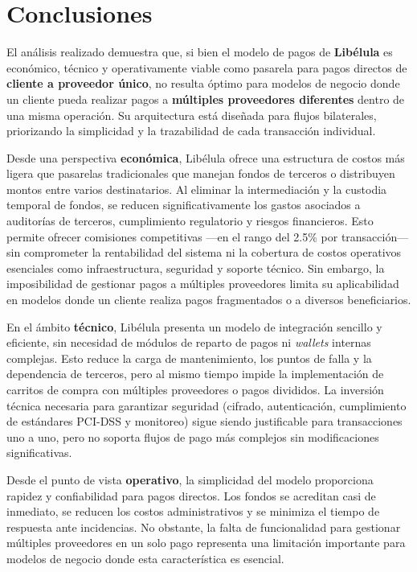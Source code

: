 \section{Conclusiones}

    El análisis realizado demuestra que, si bien el modelo de pagos de \textbf{Libélula} es económico, técnico y 
    operativamente viable como pasarela para pagos directos de \textbf{cliente a proveedor único}, no resulta óptimo para 
    modelos de negocio donde un cliente pueda realizar pagos a \textbf{múltiples proveedores diferentes} dentro de una misma 
    operación. Su arquitectura está diseñada para flujos bilaterales, priorizando la simplicidad y la trazabilidad de cada 
    transacción individual.\par

    Desde una perspectiva \textbf{económica}, Libélula ofrece una estructura de costos más ligera que pasarelas tradicionales 
    que manejan fondos de terceros o distribuyen montos entre varios destinatarios. Al eliminar la intermediación y la 
    custodia temporal de fondos, se reducen significativamente los gastos asociados a auditorías de terceros, cumplimiento 
    regulatorio y riesgos financieros. Esto permite ofrecer comisiones competitivas ---en el rango del 2.5\% por transacción--- 
    sin comprometer la rentabilidad del sistema ni la cobertura de costos operativos esenciales como infraestructura, 
    seguridad y soporte técnico. Sin embargo, la imposibilidad de gestionar pagos a múltiples proveedores limita su 
    aplicabilidad en modelos donde un cliente realiza pagos fragmentados o a diversos beneficiarios.\par

    En el ámbito \textbf{técnico}, Libélula presenta un modelo de integración sencillo y eficiente, sin necesidad de módulos 
    de reparto de pagos ni \textit{wallets} internas complejas. Esto reduce la carga de mantenimiento, los puntos de falla y 
    la dependencia de terceros, pero al mismo tiempo impide la implementación de carritos de compra con múltiples proveedores 
    o pagos divididos. La inversión técnica necesaria para garantizar seguridad (cifrado, autenticación, cumplimiento de 
    estándares PCI-DSS y monitoreo) sigue siendo justificable para transacciones uno a uno, pero no soporta flujos de pago 
    más complejos sin modificaciones significativas.\par

    Desde el punto de vista \textbf{operativo}, la simplicidad del modelo proporciona rapidez y confiabilidad para pagos 
    directos. Los fondos se acreditan casi de inmediato, se reducen los costos administrativos y se minimiza el tiempo de 
    respuesta ante incidencias. No obstante, la falta de funcionalidad para gestionar múltiples proveedores en un solo pago 
    representa una limitación importante para modelos de negocio donde esta característica es esencial.\par

